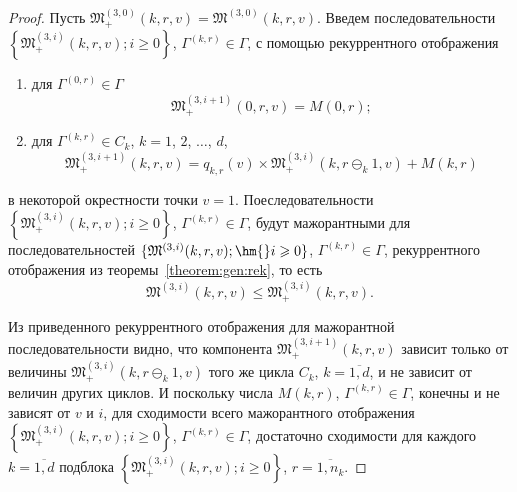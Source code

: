 \begin{proof}
Пусть $\mathfrak{M}_+^{(3, 0)}(k, r, v) =\mathfrak{M}^{(3, 0)}(k, r, v)$. Введем последовательности $\left\{\mathfrak{M}_+^{(3, i)}(k, r, v); i \geqslant 0\right\}$,  $\Gamma^{(k, r)} \in \Gamma$, с помощью рекуррентного отображения 
\begin{enumerate}[label={\arabic*)}]
\item для $ \Gamma^{(0, r)} \in \Gamma$ $$\mathfrak{M}_+^{(3, i+1)}(0, r, v) = M(0, r);$$
\item для $\Gamma^{(k,  r)} \in C_{k}$,   $k=1$,  $2$,  $\dots$,  $d$, 
$$\mathfrak{M}_+^{(3,  i+1)}(k, r, v) = q_{k, r} (v)\times  \mathfrak{M}_+^{(3, i)}(k, r \ominus_{k} 1, v) + M(k, r)$$
\end{enumerate}
в некоторой окрестности точки $v=1$. Поеследовательности $\left\{\mathfrak{M}_+^{(3, i)}(k, r, v); i \geqslant 0\right\}$,  $\Gamma^{(k, r)} \in \Gamma$,
будут мажорантными для последовательностей $\{\mathfrak{M}^{(3, i)}(k, r, v); \hm{} i \geqslant 0\}$,  $\Gamma^{(k, r)} \in \Gamma$,  рекуррентного отображения из теоремы~\ref{theorem:gen:rek}, то есть
$$
\mathfrak{M}^{(3, i)}(k, r, v) \leqslant 
\mathfrak{M}_+^{(3, i)}(k, r, v).
$$

Из приведенного рекуррентного отображения для мажорантной последовательности видно,  что компонента $\mathfrak{M}_+^{(3, i+1)}(k, r, v)$ зависит только от величины $\mathfrak{M}_+^{(3, i)}(k, r \ominus_{k} 1, v)$ того же цикла $C_k$,  $k=\overline{1, d}$,  и не зависит от величин других циклов. И поскольку числа $M(k, r)$,  $\Gamma^{(k, r)}\in \Gamma$,  конечны и не зависят от $v$ и $i$,  для сходимости всего мажорантного отображения $\left\{\mathfrak{M}_+^{(3, i)}(k, r, v); i \geqslant 0\right\}$,  $\Gamma^{(k, r)} \in \Gamma$,  достаточно сходимости для каждого $k=\overline{1, d}$ подблока $\left\{\mathfrak{M}_+^{(3, i)}(k, r, v); i \geqslant 0\right\}$,  $r =\overline{1, n_k}$. 


\end{proof}
